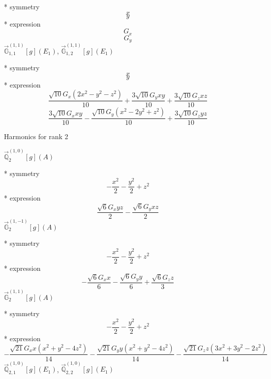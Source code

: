 \documentclass[fleqn,8pt]{jsarticle}
\begin{document}
\noindent\quad ** symmetry
\begin{dmath*}
x
\end{dmath*}
\begin{dmath*}
y
\end{dmath*}
\noindent\quad ** expression
\begin{dmath*}
G_{x}
\end{dmath*}
\begin{dmath*}
G_{y}
\end{dmath*}
\noindent\quad $\vec{\mathbb{G}}_{1,1}^{(1,1)}[g](E_{1})$, $\vec{\mathbb{G}}_{1,2}^{(1,1)}[g](E_{1})$

\noindent\quad ** symmetry
\begin{dmath*}
x
\end{dmath*}
\begin{dmath*}
y
\end{dmath*}
\noindent\quad ** expression
\begin{dmath*}
\frac{\sqrt{10} G_{x} \left(2 x^{2} - y^{2} - z^{2}\right)}{10} + \frac{3 \sqrt{10} G_{y} x y}{10} + \frac{3 \sqrt{10} G_{z} x z}{10}
\end{dmath*}
\begin{dmath*}
\frac{3 \sqrt{10} G_{x} x y}{10} - \frac{\sqrt{10} G_{y} \left(x^{2} - 2 y^{2} + z^{2}\right)}{10} + \frac{3 \sqrt{10} G_{z} y z}{10}
\end{dmath*}

\noindent * Harmonics for rank 2

\noindent\quad $\vec{\mathbb{Q}}_{2}^{(1,0)}[g](A)$

\noindent\quad ** symmetry
\begin{dmath*}
- \frac{x^{2}}{2} - \frac{y^{2}}{2} + z^{2}
\end{dmath*}
\noindent\quad ** expression
\begin{dmath*}
\frac{\sqrt{6} G_{x} y z}{2} - \frac{\sqrt{6} G_{y} x z}{2}
\end{dmath*}
\noindent\quad $\vec{\mathbb{G}}_{2}^{(1,-1)}[g](A)$

\noindent\quad ** symmetry
\begin{dmath*}
- \frac{x^{2}}{2} - \frac{y^{2}}{2} + z^{2}
\end{dmath*}
\noindent\quad ** expression
\begin{dmath*}
- \frac{\sqrt{6} G_{x} x}{6} - \frac{\sqrt{6} G_{y} y}{6} + \frac{\sqrt{6} G_{z} z}{3}
\end{dmath*}
\noindent\quad $\vec{\mathbb{G}}_{2}^{(1,1)}[g](A)$

\noindent\quad ** symmetry
\begin{dmath*}
- \frac{x^{2}}{2} - \frac{y^{2}}{2} + z^{2}
\end{dmath*}
\noindent\quad ** expression
\begin{dmath*}
- \frac{\sqrt{21} G_{x} x \left(x^{2} + y^{2} - 4 z^{2}\right)}{14} - \frac{\sqrt{21} G_{y} y \left(x^{2} + y^{2} - 4 z^{2}\right)}{14} - \frac{\sqrt{21} G_{z} z \left(3 x^{2} + 3 y^{2} - 2 z^{2}\right)}{14}
\end{dmath*}
\noindent\quad $\vec{\mathbb{Q}}_{2,1}^{(1,0)}[g](E_{1})$, $\vec{\mathbb{Q}}_{2,2}^{(1,0)}[g](E_{1})$
\end{document}
